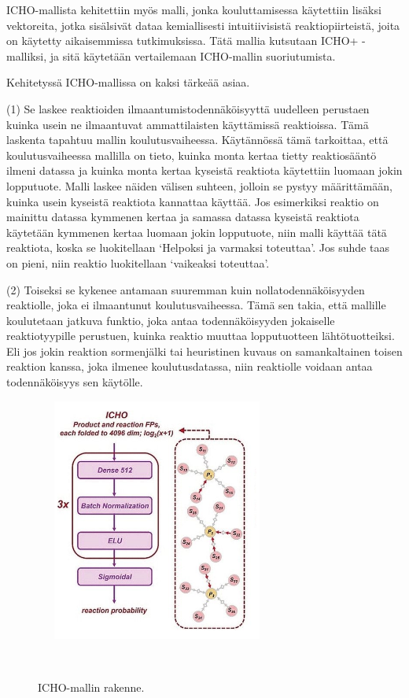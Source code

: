 \documentclass[finnish,twoside,censored,tkt,sw-line]{HYthesisML}
\begin{document}
ICHO-mallista kehitettiin myös malli, jonka kouluttamisessa käytettiin lisäksi vektoreita, jotka sisälsivät dataa kemiallisesti intuitiivisistä reaktiopiirteistä, joita on käytetty aikaisemmissa tutkimuksissa.
Tätä mallia kutsutaan ICHO+ -malliksi, ja sitä käytetään vertailemaan ICHO-mallin suoriutumista.

Kehitetyssä ICHO-mallissa on kaksi tärkeää asiaa.

(1) Se laskee reaktioiden ilmaantumistodennäköisyyttä uudelleen perustaen kuinka usein ne ilmaantuvat ammattilaisten käyttämissä reaktioissa.
Tämä laskenta tapahtuu mallin koulutusvaiheessa.
Käytännössä tämä tarkoittaa, että koulutusvaiheessa mallilla on tieto, kuinka monta kertaa tietty reaktiosääntö ilmeni datassa ja kuinka monta kertaa kyseistä reaktiota käytettiin luomaan jokin lopputuote.
Malli laskee näiden välisen suhteen, jolloin se pystyy määrittämään, kuinka usein kyseistä reaktiota kannattaa käyttää.
Jos esimerkiksi reaktio on mainittu datassa kymmenen kertaa ja samassa datassa kyseistä reaktiota käytetään kymmenen kertaa luomaan jokin lopputuote, niin malli käyttää tätä reaktiota, koska se luokitellaan `Helpoksi ja varmaksi toteuttaa'.
Jos suhde taas on pieni, niin reaktio luokitellaan `vaikeaksi toteuttaa'.

(2) Toiseksi se kykenee antamaan suuremman kuin nollatodennäköisyyden reaktiolle, joka ei ilmaantunut koulutusvaiheessa.
Tämä sen takia, että mallille koulutetaan jatkuva funktio, joka antaa todennäköisyyden jokaiselle reaktiotyypille perustuen, kuinka reaktio muuttaa lopputuotteen lähtötuotteiksi.
Eli jos jokin reaktion sormenjälki tai heuristinen kuvaus on samankaltainen toisen reaktion kanssa, joka ilmenee koulutusdatassa, niin reaktiolle voidaan antaa todennäköisyys sen käytölle.

\begin{figure}[!ht]
    \centering
    \includegraphics[width=8cm, height=8cm]{icho-neuralnetwork.png}
    \caption{ICHO-mallin rakenne.}
    {~\cite{ExpertKnowledgeRetorsynthesis}}
    \label{fig:icho-neuralnetwork}
\end{figure}
\end{document}
